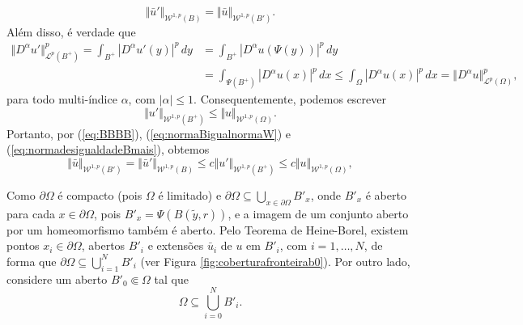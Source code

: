 \documentclass[a4paper, 11pt]{book}
\theoremstyle{definition}
\newcommand{\cL}{\mathcal{L}}
\newcommand{\cW}{\mathcal{W}}
\begin{document}
\begin{prf}
\begin{equation}
        \Vert \bar u' \Vert_{\cW^{1,p}(B)} = \Vert  \bar u \Vert_{\cW^{1,p}(B')}.
    \end{equation}
    Além disso, é verdade que
    \[
        \begin{aligned}
            \Vert D^\alpha u' \Vert_{\cL^p(B^+)}^p = \int_{B^+} |D^\alpha u'(y) |^p \,dy &= \int_{B^+} |D^\alpha u (\Psi(y))|^p \,dy\\ &= \int_{\Psi(B^+)} |D^\alpha u(x)|^p \,dx \leqslant \int_{\Omega} |D^\alpha u(x)|^p \,dx = \Vert D^\alpha u \Vert_{\cL^p(\Omega)}^p,
        \end{aligned}
    \]
    para todo multi-índice $\alpha$, com $|\alpha| \leqslant 1$.
    Consequentemente, podemos escrever
    \begin{equation} \label{eq:normadesigualdadeBmais}
        \Vert u' \Vert_{\cW^{1,p}(B^+)} \leqslant \Vert u \Vert_{\cW^{1,p}(\Omega)}.
    \end{equation}
    Portanto, por (\ref{eq:BBBB}), (\ref{eq:normaBigualnormaW}) e (\ref{eq:normadesigualdadeBmais}), obtemos
    \begin{equation} \label{eq:desigualdadeWO}
        \Vert \bar u \Vert_{\cW^{1,p}(B')} = \Vert \bar u' \Vert_{\cW^{1,p}(B)} \leqslant c \Vert u' \Vert_{\cW^{1,p}(B^+)} \leqslant c \Vert u \Vert_{\cW^{1,p}(\Omega)},
    \end{equation}

    Como $\partial\Omega$ é compacto (pois $\Omega$ é limitado) e $\partial \Omega \subseteq \bigcup_{x \in \partial\Omega} B'_x$,
    onde $B'_x$ é aberto para cada $x \in \partial\Omega$, pois $B'_x = \Psi(B(\tilde y, r))$, e a imagem de um conjunto aberto por um homeomorfismo também é aberto. Pelo Teorema de Heine-Borel, existem pontos $x_i \in \partial\Omega$, abertos $B'_i$ e extensões $\bar u_i$ de $u$ em $B'_i$, com $i = 1,\dots,N$, de forma que $\partial\Omega \subseteq \bigcup_{i=1}^N B'_i$ (ver Figura \ref{fig:coberturafronteirab0}).
    Por outro lado, considere um aberto $B'_0 \Subset \Omega$ tal que
    \[
        \Omega \subseteq \bigcup_{i=0}^N B'_i.
    \]
    \begin{figure}
        \centering
\end{figure}
\end{prf}
\end{document}
